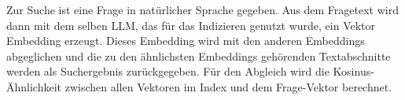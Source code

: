 \documentclass[../main.tex]{subfiles}
\begin{document}
Zur Suche ist eine Frage in natürlicher Sprache gegeben.
Aus dem Fragetext wird dann mit dem selben \gls{LLM}, das für das Indizieren genutzt wurde, ein Vektor Embedding erzeugt.
Dieses Embedding wird mit den anderen Embeddings abgeglichen und die zu den ähnlichsten Embeddings gehörenden Textabschnitte werden als Suchergebnis zurückgegeben. 
Für den Abgleich wird die Kosinus-Ähnlichkeit\cite{rahutomo2012semantic} zwischen allen Vektoren im Index und dem Frage-Vektor berechnet.
\end{document}
